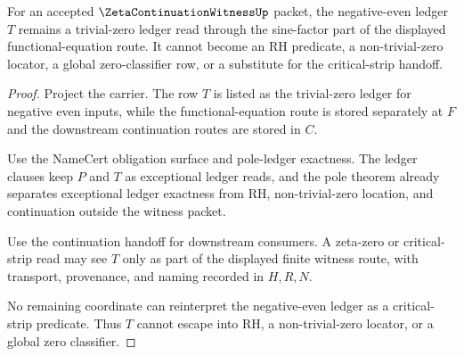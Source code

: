 \begin{theorem}
\label{thm:zeta-continuation-witness-trivial-zero-ledger-nonescape}
For an accepted $\ZetaContinuationWitnessUp$ packet, the negative-even ledger $T$ remains a trivial-zero ledger read through the sine-factor part of the displayed functional-equation route. It cannot become an RH predicate, a non-trivial-zero locator, a global zero-classifier row, or a substitute for the critical-strip handoff.
\end{theorem}
\begin{proof}
Project the carrier. The row $T$ is listed as the trivial-zero ledger for negative even inputs, while the functional-equation route is stored separately at $F$ and the downstream continuation routes are stored in $C$.

Use the NameCert obligation surface and pole-ledger exactness. The ledger clauses keep $P$ and $T$ as exceptional ledger reads, and the pole theorem already separates exceptional ledger exactness from RH, non-trivial-zero location, and continuation outside the witness packet.

Use the continuation handoff for downstream consumers. A zeta-zero or critical-strip read may see $T$ only as part of the displayed finite witness route, with transport, provenance, and naming recorded in $H,R,N$.

No remaining coordinate can reinterpret the negative-even ledger as a critical-strip predicate. Thus $T$ cannot escape into RH, a non-trivial-zero locator, or a global zero classifier.
\end{proof}



